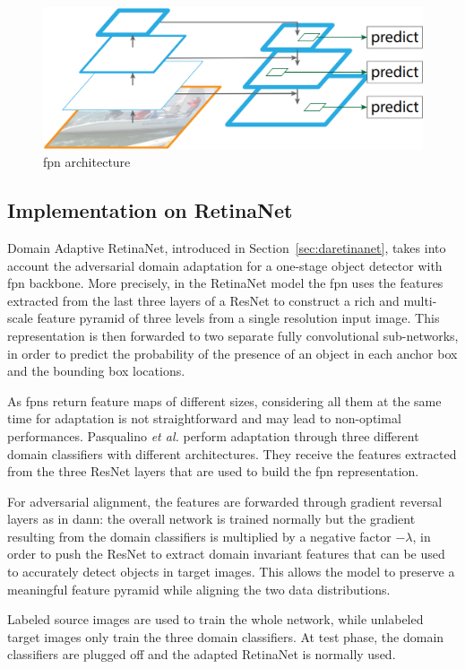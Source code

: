 \documentclass[%
    corpo=12pt,
    twoside,
    stile=classica,   
    tipotesi=magistrale,
    evenboxes,
    english,
	numerazioneromana,
]{toptesi}
\begin{document}
\begin{figure}[ht]
	\centering
	\includegraphics[width=.6\linewidth]{imgs/fpn.png}
	\caption{\Gls{fpn} architecture\cite{chen2018domain}}
	\label{fig:fpn}
\end{figure}

\subsection{Implementation on RetinaNet}
Domain Adaptive RetinaNet, introduced in Section~\ref{sec:daretinanet}, takes into account the adversarial domain adaptation for a one-stage object detector with \gls{fpn} backbone. More precisely, in the RetinaNet model the \gls{fpn} uses the features extracted from the last three layers of a ResNet to construct a rich and multi-scale feature pyramid of three levels from a single resolution input image. This representation is then forwarded to two separate fully convolutional sub-networks, in order to predict the probability of the presence of an object in each anchor box and the bounding box locations.

\bigskip
As \glspl{fpn} return feature maps of different sizes, considering all them at the same time for adaptation is not straightforward and may lead to non-optimal performances. Pasqualino \textit{et al.}\cite{pasqualino2020unsupervised} perform adaptation through three different domain classifiers with different architectures. They receive the features extracted from the three ResNet layers that are used to build the \gls{fpn} representation.

For adversarial alignment, the features are forwarded through gradient reversal layers as in \gls{dann}: the overall network is trained normally but the gradient resulting from the domain classifiers is multiplied by a negative factor $-\lambda$, in order to push the ResNet to extract domain invariant features that can be used to accurately detect objects in target images. This allows the model to preserve a meaningful feature pyramid while aligning the two data distributions.


Labeled source images are used to train the whole network, while unlabeled target images only train the three domain classifiers. At test phase, the domain classifiers are plugged off and the adapted RetinaNet is normally used.
\end{document}
